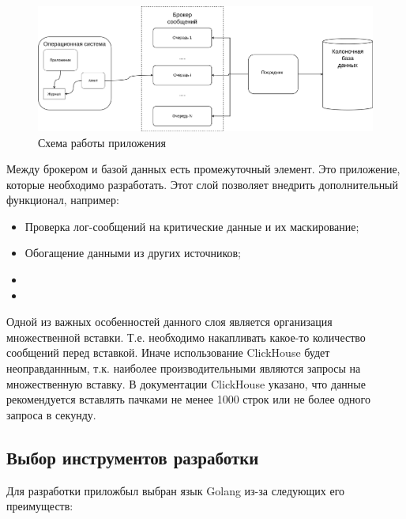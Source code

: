 \documentclass[14pt, russian]{scrartcl}
\begin{document}
\begin{figure}[H]
	\centering
	\begin{minipage}[t]{.9\textwidth}
		\centering
		\includegraphics[width=.7\textwidth]{./imgs/appscheme.png}
	\end{minipage}
	\caption{Схема работы приложения}
	\label{fig:appscheme}
\end{figure}


Между брокером и базой данных есть промежуточный элемент. Это приложение,
которые необходимо разработать. Этот слой позволяет
внедрить дополнительный функционал, например:

\begin{itemize}
	\item Проверка лог-сообщений на критические данные и их маскирование;
	\item Обогащение данными из других источников;
	\item
	\item
\end{itemize}

Одной из важных особенностей данного слоя является организация
множественной вставки. Т.е. необходимо накапливать
какое-то количество сообщений перед вставкой.
Иначе использование ClickHouse будет неоправданнным, т.к.
наиболее производительными являются запросы на множественную
вставку. В документации ClickHouse \cite{ClickDocs} указано, что данные
рекомендуется вставлять пачками не менее 1000 строк
или не более одного запроса в секунду.

\subsection{Выбор инструментов разработки}

Для разработки приложбыл выбран язык Golang \cite{Golang} из-за следующих его преимуществ:
\end{document}
